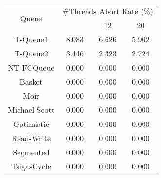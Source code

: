 \begin{tabular}{|c|c|c|c|}
\hline
\multirow{2}{*}{Queue} & \multicolumn{3}{c|}{\#Threads Abort Rate (\%)}\\\cline{2-4}& \quad 4 & 12 & 20\\
\hline
\hline
T-Queue1 & 8.083 & 6.626 & 5.902\\
T-Queue2 & 3.446 & 2.323 & 2.724\\
NT-FCQueue & 0.000 & 0.000 & 0.000\\
Basket & 0.000 & 0.000 & 0.000\\
Moir & 0.000 & 0.000 & 0.000\\
Michael-Scott & 0.000 & 0.000 & 0.000\\
Optimistic & 0.000 & 0.000 & 0.000\\
Read-Write & 0.000 & 0.000 & 0.000\\
Segmented & 0.000 & 0.000 & 0.000\\
TsigasCycle & 0.000 & 0.000 & 0.000\\
\hline\end{tabular}
